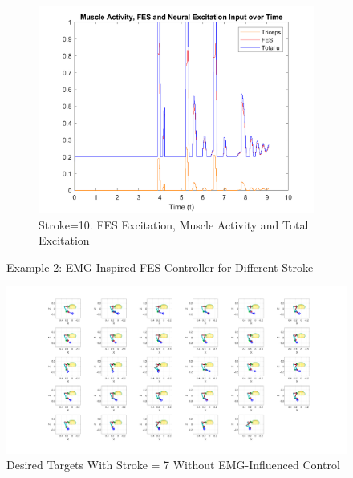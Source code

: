 \begin{landscape}
\begin{figure}[ht]
        \begin{subfigure}[b]{0.33\textwidth}
            \centering
            \includegraphics[width=\linewidth]{Pictures/Results/Controller/Stroke10/6_fes.png}
            \caption{Stroke=10. FES Excitation, Muscle Activity and Total Excitation}
        \end{subfigure}
            
        \caption{Example 2: EMG-Inspired FES Controller for Different Stroke}
        \label{fig:Ex2FESControllerDifferentStrokes}
    \end{figure}
\end{landscape}

\newpage
\begin{landscape} %
  \begin{figure}[h!]
    \centering
    \includegraphics[width=1.9\textwidth]{Pictures/Results/Controller/WithStroke29positions.png} %
    \caption{Desired Targets With Stroke = 7 Without EMG-Influenced Control} %
  \end{figure}
\end{landscape} %



